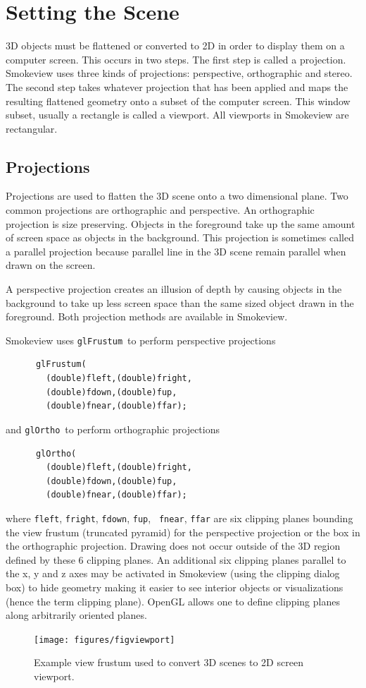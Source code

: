 \documentclass[11pt,twoside]{book}
\newcommand{\figoptions}{htp}
\begin{document}
\chapter{Setting the Scene}
3D objects must be flattened or converted to 2D in order to display them on a computer screen.  This occurs in two steps.  The first step is called a projection.  Smokeview uses three kinds of projections: perspective, orthographic and stereo.  The second step takes whatever projection that has been applied and maps the resulting flattened geometry onto a subset of the computer screen.  This window subset, usually a rectangle is called a viewport.  All viewports in Smokeview are rectangular.

\section{Projections}
Projections are used to flatten the 3D scene onto a two dimensional plane. Two common projections are orthographic and perspective. An orthographic projection is size preserving. Objects in the foreground take up the same amount of screen space as objects in the background.
This projection is sometimes called a parallel projection because parallel line in the 3D scene remain parallel when drawn on the screen.

A perspective
projection creates an illusion of depth by causing objects in the background to take up less screen space than the same sized object drawn in the foreground.  Both projection methods are available in Smokeview.

Smokeview uses {\tt glFrustum}\ to perform perspective projections
\begin{verbatim}
      glFrustum(
        (double)fleft,(double)fright,
        (double)fdown,(double)fup,
        (double)fnear,(double)ffar);
\end{verbatim}
and {\tt glOrtho}\ to perform orthographic projections
\begin{verbatim}
      glOrtho(
        (double)fleft,(double)fright,
        (double)fdown,(double)fup,
        (double)fnear,(double)ffar);
\end{verbatim}

\noindent where {\tt fleft}, {\tt fright}, {\tt fdown}, {\tt fup}, {\tt
fnear}, {\tt ffar} are six clipping planes bounding the view
frustum (truncated pyramid) for the perspective projection or the
box in the orthographic projection.  Drawing does not occur
outside of the 3D region defined by these 6 clipping planes. An
additional six clipping planes parallel to the x, y and z axes may
be activated in Smokeview (using the clipping dialog box) to hide
geometry making it easier to see interior objects or
visualizations (hence the term clipping plane).  OpenGL allows one to define clipping planes along
arbitrarily oriented planes.
\begin{figure}[\figoptions]
\begin{center}
\texttt{[image: figures/figviewport]}
\end{center}
\caption{Example view frustum used to convert 3D scenes to 2D
screen viewport.}
 \label{figfrustum}
\end{figure}
\end{document}
